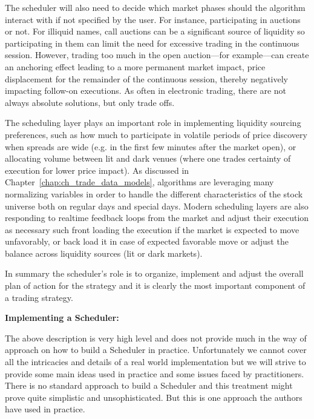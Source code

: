 The scheduler will also need to decide which market phases should the algorithm interact with if not specified by the user. For instance, participating in auctions or not. For illiquid names, call auctions can be a significant source of liquidity so participating in them can limit the need for excessive trading in the continuous session. However, trading too much in the open auction---for example---can create an anchoring effect leading to a more permanent market impact, price displacement for the remainder of the continuous session, thereby negatively impacting follow-on executions. As often in electronic trading, there are not always absolute solutions, but only trade offs.


The scheduling layer plays an important role in  implementing liquidity sourcing preferences, such as how much to participate in volatile periods of price discovery when spreads are wide (e.g. in the first few minutes after the market open), or allocating volume between lit and dark venues (where one trades certainty of execution for lower price impact). As discussed in Chapter~\ref{chap:ch_trade_data_models}, algorithms are leveraging many normalizing  variables in order to handle the different characteristics of the stock universe both on regular days and special days.  Modern scheduling layers are also responding to realtime feedback loops from the market and adjust their execution as necessary such front loading the execution if the market is expected to move unfavorably, or back load it in case of expected favorable move or adjust the balance across liquidity sources (lit or dark markets). 


In summary the scheduler's role is to organize, implement and adjust the overall plan of action for the strategy and it is clearly the most important component of a trading strategy. \twomedskip


\noindent\textbf{Implementing a Scheduler:} \twomedskip


The above description is very high level and does not provide much in the way of approach on how to build a Scheduler in practice. Unfortunately we cannot cover all the intricacies and details of a real world implementation but we will strive to provide some main ideas used in practice and some issues faced by practitioners. There is no standard approach to build a Scheduler and this treatment might prove quite simplistic and unsophisticated. But this is one approach the authors have used in practice. \twomedskip


